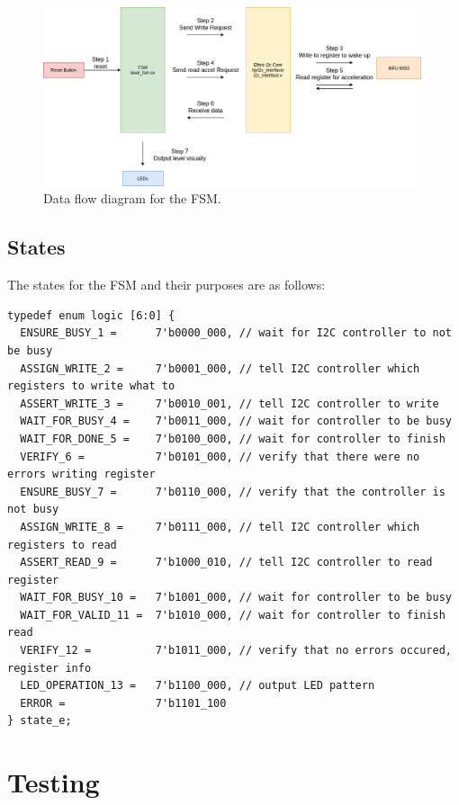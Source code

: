 \documentclass[11pt]{article}
\begin{document}
\begin{figure}[H]
    \centering
\includegraphics[width=0.99\textwidth]{data_flow.png}
    \caption{Data flow diagram for the FSM.}
\end{figure}

\subsection{States}
The states for the FSM and their purposes are as follows:

\begin{lstlisting}[style={verilog-style}, basicstyle=\tiny,]
typedef enum logic [6:0] { 
  ENSURE_BUSY_1 =      7'b0000_000, // wait for I2C controller to not be busy
  ASSIGN_WRITE_2 =     7'b0001_000, // tell I2C controller which registers to write what to
  ASSERT_WRITE_3 =     7'b0010_001, // tell I2C controller to write
  WAIT_FOR_BUSY_4 =    7'b0011_000, // wait for controller to be busy
  WAIT_FOR_DONE_5 =    7'b0100_000, // wait for controller to finish
  VERIFY_6 =           7'b0101_000, // verify that there were no errors writing register
  ENSURE_BUSY_7 =      7'b0110_000, // verify that the controller is not busy
  ASSIGN_WRITE_8 =     7'b0111_000, // tell I2C controller which registers to read
  ASSERT_READ_9 =      7'b1000_010, // tell I2C controller to read register
  WAIT_FOR_BUSY_10 =   7'b1001_000, // wait for controller to be busy
  WAIT_FOR_VALID_11 =  7'b1010_000, // wait for controller to finish read
  VERIFY_12 =          7'b1011_000, // verify that no errors occured, register info
  LED_OPERATION_13 =   7'b1100_000, // output LED pattern
  ERROR =              7'b1101_100
} state_e;

\end{lstlisting}

\section{Testing}
\end{document}
